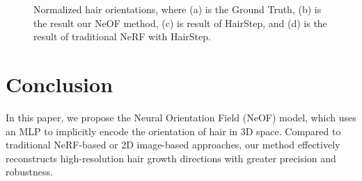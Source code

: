 \documentclass{article}
\begin{document}
\begin{figure}[h]
    
    \caption{Normalized hair orientations, where (a) is the Ground Truth, (b) is the result our NeOF method, (c) is result of HairStep, and (d) is the result of traditional NeRF with HairStep.}
    \label{fig:result_grid}
\end{figure}



\section{Conclusion}
In this paper, we propose the Neural Orientation Field (NeOF) model, which uses an MLP to implicitly encode the orientation of hair in 3D space. Compared to traditional NeRF-based or 2D image-based approaches, our method effectively reconstructs high-resolution hair growth directions with greater precision and robustness. 
\end{document}
